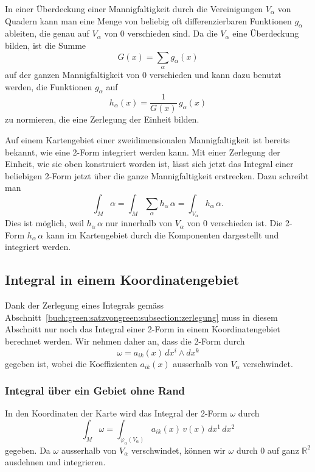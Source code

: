 In einer Überdeckung einer Mannigfaltigkeit durch die Vereinigungen
$V_\alpha$ von Quadern kann man eine Menge von beliebig oft
differenzierbaren Funktionen
$g_\alpha$ ableiten, die genau auf $V_\alpha$ von $0$ verschieden
sind.
Da die $V_\alpha$ eine Überdeckung bilden, ist die Summe
\[
G(x) = \sum_{\alpha} g_\alpha(x)
\]
auf der ganzen Mannigfaltigkeit von $0$ verschieden und kann dazu
benutzt werden, die Funktionen $g_\alpha$ auf
\[
h_\alpha(x) = \frac{1}{G(x)}\,g_\alpha(x)
\]
zu normieren, die eine Zerlegung der Einheit bilden.

Auf einem Kartengebiet einer zweidimensionalen Mannigfaltigkeit
ist bereits bekannt, wie eine 2-Form integriert werden kann.
Mit einer Zerlegung der Einheit, wie sie oben konstruiert worden ist,
lässt sich jetzt das Integral einer beliebigen 2-Form jetzt über
die ganze Mannigfaltigkeit erstrecken.
Dazu schreibt man
\[
\int_M \alpha
=
\int_M \sum_{\alpha}h_\alpha\,\alpha
=
\int_{V_\alpha} h_\alpha\,\alpha.
\]
Dies ist möglich, weil $h_\alpha\,\alpha$ nur innerhalb von $V_\alpha$
von $0$ verschieden ist.
Die 2-Form $h_\alpha\,\alpha$ kann im Kartengebiet durch die
Komponenten dargestellt und integriert werden.

%
%
\subsection{Integral in einem Koordinatengebiet}
Dank der Zerlegung eines Integrals gemäss
Abschnitt~\ref{buch:green:satzvongreen:subsection:zerlegung}
muss in diesem Abschnitt nur noch das Integral einer 2-Form in
einem Koordinatengebiet berechnet werden.
Wir nehmen daher an, dass die 2-Form durch
\[
\omega
=
a_{ik}(x)\,dx^i\wedge dx^k
\]
gegeben ist, wobei die Koeffizienten $a_{ik}(x)$ ausserhalb
von $V_\alpha$ verschwindet.

%
%
\subsubsection{Integral über ein Gebiet ohne Rand}
In den Koordinaten der Karte wird das Integral der 2-Form $\omega$
durch
\begin{equation}
\int_M \omega
=
\int_{\varphi_\alpha(V_\alpha)}
a_{ik}(x)\, v(x)
\,dx^1\,dx^2
\label{buch:green:green:eqn:koordinatenform}
\end{equation}
gegeben.
Da $\omega$ ausserhalb von $V_\alpha$ verschwindet, können wir $\omega$
durch 0 auf ganz $\mathbb{R}^2$ ausdehnen und integrieren.

